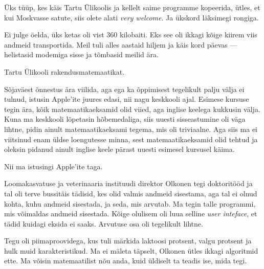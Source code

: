 
Üks tüüp, kes käis Tartu Ülikoolis ja kellelt saime programme kopeerida, 
ütles, et kui Moskvasse satute, siis olete alati \emph{very welcome}. 
Ja ükskord läksimegi rongiga.


Ei julge öelda, üks ketas oli vist 360 kilobaiti. Eks see oli 
ikkagi kõige kiirem viis andmeid transportida. Meil tuli alles
aastaid hiljem ja käis kord päevas --- helistasid modemiga 
sisse ja tõmbasid meilid ära.


Tartu Ülikooli rakendusmatemaatikat. 


Sõjaväest õnnestus ära viilida, aga ega ka õppimisest tegelikult palju välja ei tulnud, istusin Apple'ite juures edasi, nii nagu 
keskkooli ajal. Esimese kursuse tegin ära, kõik matemaatikaeksamid olid viied, aga inglise keelega kukkusin välja. Kuna ma keskkooli lõpetasin hõbemedaliga, siis uuesti sisseastumine oli väga lihtne, pidin ainult matemaatikaeksami tegema, mis oli triviaalne. Aga siis ma ei viitsinud enam üldse 
loengutesse minna, sest matemaatikaeksamid olid tehtud ja oleksin pidanud 
ainult inglise keele pärast uuesti esimesel kursusel käima.

Nii ma istusingi Apple'ite taga. 

Loomakasvatuse ja veterinaaria instituudi direktor Olkonen tegi 
doktoritööd ja tal oli terve bussitäis tädisid, kes olid valmis andmeid 
sisestama, aga tal ei olnud kohta, kuhu andmeid sisestada, ja seda, mis arvutab. 
Ma tegin talle programmi, mis võimaldas andmeid sisestada. Kõige olulisem oli luua selline \emph{user inteface}, et tädid kuidagi eksida ei 
saaks. Arvutuse osa oli tegelikult 
lihtne.


Tegu oli piimaproovidega, kus tuli märkida laktoosi protsent, valgu protsent ja hulk 
muid karakteristikud. Ma ei mäleta täpselt, Olkonen ütles ikkagi
algoritmid ette. Ma võisin matemaatilist nõu anda, kuid
üldiselt ta teadis ise, mida tegi. 

